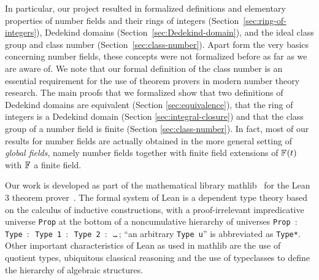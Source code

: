 \documentclass[a4paper,USenglish,cleveref, autoref, thm-restate]{lipics-v2021}
\newcommand{\lean}[1]{\texttt{#1}\xspace} %
\newcommand*{\Fq}[1][q]{\mathbb{F}_{#1}}
\newcommand{\mathlib}{\textsf{mathlib}\xspace}
\newcommand{\Z}{\mathbb{Z}}
\begin{document}
In particular, our project resulted in formalized definitions and elementary properties of
number fields and their rings of integers (Section~\ref{sec:ring-of-integers}),
Dedekind domains (Section~\ref{sec:Dedekind-domain}),
and the ideal class group and class number (Section~\ref{sec:class-number}).
Apart form the very basics concerning number fields, these concepts were not formalized before as far as we are aware of.
We note that our formal definition of the class number is an essential requirement for the use of theorem provers in modern number theory research.
%
The main proofs that we formalized show
that two definitions of Dedekind domains are equivalent (Section \ref{sec:equivalence}),
that the ring of integers %
is a Dedekind domain (Section \ref{sec:integral-closure})
and that the class group of a number field is finite (Section \ref{sec:class-number}).
In fact, most of our results for number fields are actually obtained in the more general setting of \emph{global fields},
namely number fields together with finite field extensions of $\Fq[\empty](t)$ with $\Fq[\empty]$ a finite field.

%
%
%

Our work is developed as part of the mathematical library \mathlib~\cite{mathlib} for the Lean 3 theorem prover~\cite{lean-prover}.
The formal system of Lean is a dependent type theory based on the calculus of inductive constructions,
with a proof-irrelevant impredicative universe \lean{Prop} at the bottom of a noncumulative hierarchy of universes \lean{Prop $:$ Type $:$ Type 1 $:$ \mbox{Type 2} $:$ \dots}\,; ``an arbitrary \lean{Type u}'' is abbreviated as \lean{Type*}.
Other important characteristics of Lean as used in \mathlib are the use of quotient types, ubiquitous classical reasoning and the use of typeclasses to define the hierarchy of algebraic structures.
\end{document}
